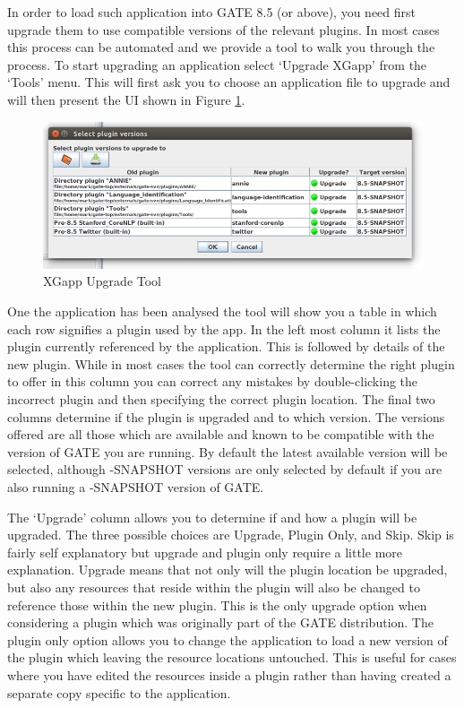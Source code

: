 In order to load such application into GATE 8.5 (or above), you need first upgrade them to use compatible versions of the relevant plugins.
In most cases this process can be automated and we provide a tool to walk you through the process. To start upgrading an application select
`Upgrade XGapp' from the `Tools' menu. This will first ask you to choose an application file to upgrade and will then present the UI shown in
Figure \ref{fig:upgrade-tool}.

\begin{figure}[htb]
\begin{center}
\includegraphics[width=\textwidth]{upgrade-tool.png}
\end{center}
\caption{XGapp Upgrade Tool}
\label{fig:upgrade-tool}
\end{figure}

One the application has been analysed the tool will show you a table in which each row signifies a plugin used by the app. In the left most
column it lists the plugin currently referenced by the application. This is followed by details of the new plugin. While in most cases
the tool can correctly determine the right plugin to offer in this column you can correct any mistakes by double-clicking the incorrect
plugin and then specifying the correct plugin location. The final two columns determine if the plugin is upgraded and to which version.
The versions offered are all those which are available and known to be compatible with the version of GATE you are running. By default the
latest available version will be selected, although -SNAPSHOT versions are only selected by default if you are also running a -SNAPSHOT version
of GATE.

The `Upgrade' column allows you to determine if and how a plugin will be upgraded. The three possible choices are Upgrade, Plugin Only, and Skip.
Skip is fairly self explanatory but upgrade and plugin only require a little more explanation. Upgrade means that not only will the plugin location
be upgraded, but also any resources that reside within the plugin will also be changed to reference those within the new plugin. This is the only
upgrade option when considering a plugin which was originally part of the GATE distribution. The plugin only option allows you to change the application
to load a new version of the plugin which leaving the resource locations untouched. This is useful for cases where you have edited the resources inside a
plugin rather than having created a separate copy specific to the application.

